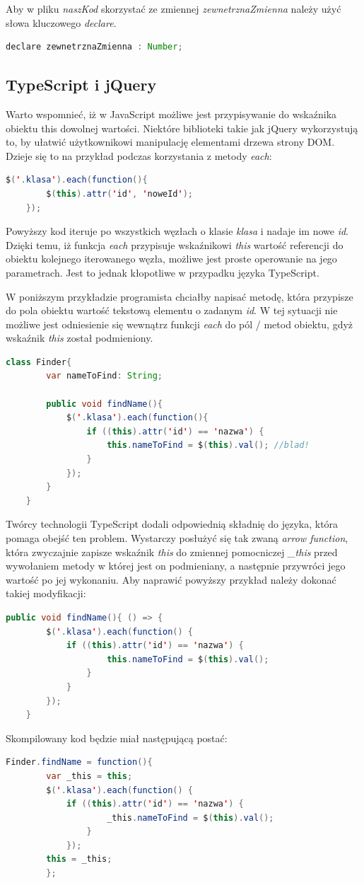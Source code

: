 Aby w pliku \textit{naszKod} skorzystać ze zmiennej \textit{zewnetrznaZmienna} należy użyć słowa kluczowego \textit{declare}.
\begin{lstlisting}[language=Java]
	declare zewnetrznaZmienna : Number;
\end{lstlisting}

\subsection{TypeScript i jQuery}
Warto wspomnieć, iż w JavaScript możliwe jest przypisywanie do wskaźnika obiektu this dowolnej wartości. Niektóre biblioteki takie jak jQuery wykorzystują to, by ułatwić użytkownikowi manipulację elementami drzewa strony DOM. Dzieje się to na przykład podczas korzystania z metody \textit{each}:

\begin{lstlisting}[language=Java]
	$('.klasa').each(function(){
		$(this).attr('id', 'noweId');
	});
\end{lstlisting}
Powyższy kod iteruje po wszystkich węzłach o klasie \textit{klasa} i nadaje im nowe \textit{id}. Dzięki temu, iż funkcja \textit{each} przypisuje wskaźnikowi \textit{this} wartość referencji do obiektu kolejnego iterowanego węzła, możliwe jest proste operowanie na jego parametrach. Jest to jednak kłopotliwe w przypadku języka TypeScript.

W poniższym przykładzie programista chciałby napisać metodę, która przypisze do pola obiektu wartość tekstową elementu o zadanym \textit{id}. W tej sytuacji nie możliwe jest odniesienie się wewnątrz funkcji \textit{each} do pól / metod obiektu, gdyż wskaźnik \textit{this} został podmieniony.
\begin{lstlisting}[language=Java]
	class Finder{
		var nameToFind: String;
	
		public void findName(){
			$('.klasa').each(function(){
				if ((this).attr('id') == 'nazwa') {
					this.nameToFind = $(this).val(); //blad!
				}
			});
		}
	}
\end{lstlisting}

Twórcy technologii TypeScript dodali odpowiednią składnię do języka, która pomaga obejść ten problem. Wystarczy posłużyć się tak zwaną \textit{arrow function}, która zwyczajnie zapisze wskaźnik \textit{this} do zmiennej pomocniczej \textit{\_this} przed wywołaniem metody w której jest on podmieniany, a następnie przywróci jego wartość po jej wykonaniu. Aby naprawić powyższy przykład należy dokonać takiej modyfikacji:

\begin{lstlisting}[language=Java]
	public void findName(){ () => {
		$('.klasa').each(function() {
			if ((this).attr('id') == 'nazwa') { 
					this.nameToFind = $(this).val();
				}
			}
		});
	}
\end{lstlisting}

Skompilowany kod będzie miał następującą postać:
\begin{lstlisting}[language=Java]
	Finder.findName = function(){ 
		var _this = this;
		$('.klasa').each(function() {
			if ((this).attr('id') == 'nazwa') { 
					_this.nameToFind = $(this).val();
				}
			});
		this = _this;
		};
\end{lstlisting}
